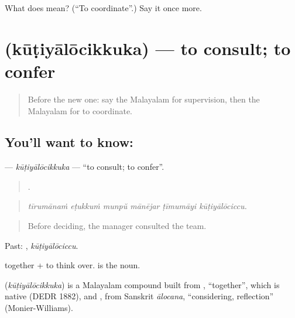 \begin{tcolorbox}[breakable,colback=teal!4,colframe=teal!35!black,title={Before you move on}]
What does  mean? (\textquotedblleft{}To coordinate\textquotedblright{}.) Say it once more.
\end{tcolorbox}
\section[\texorpdfstring{\ml{കൂടിയാലോചിക്കുക} (kūṭiyālōcikkuka)}{കൂടിയാലോചിക്കുക (kūṭiyālōcikkuka)}]{ (kūṭiyālōcikkuka) — to consult; to confer}

\label{lesson:ML-C550-kutiyalocikkuka}



\begin{quote}
Before the new one: say the Malayalam for supervision, then the Malayalam for to coordinate.
\end{quote}

\subsection*{You'll want to know: }
\textbf{} — \emph{kūṭiyālōcikkuka} — \textquotedblleft{}to consult; to confer\textquotedblright{}.

\begin{quote}
     .
\end{quote}

\begin{quote}
\emph{tīrumānaṁ eṭukkuṁ munpŭ mānējar ṭīmumāyi kūṭiyālōciccu.}
\end{quote}

\begin{quote}
Before deciding, the manager consulted the team.
\end{quote}

Past: , \emph{kūṭiyālōciccu}.

 together +  to think over.  is the noun.

\begin{cousinweb}
\textbf{} (\emph{kūṭiyālōcikkuka}) is a Malayalam compound built from , \textquotedblleft{}together\textquotedblright{}, which is native (DEDR 1882), and , from Sanskrit \emph{ālocana}, \textquotedblleft{}considering, reflection\textquotedblright{} (Monier-Williams).
\end{cousinweb}

